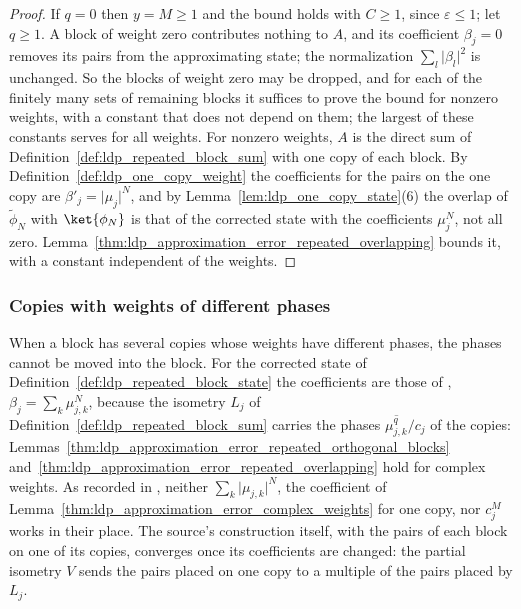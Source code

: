 \begin{proof}
    \leanok
    If $q=0$ then $y=M\geq1$ and the bound holds with $C\geq1$, since
    $\varepsilon\leq1$; let $q\geq1$. A block of weight zero contributes nothing to $A$,
    and its coefficient $\beta_j=0$ removes its pairs from the approximating state; the
    normalization $\sum_l\lvert\beta_l\rvert^2$ is unchanged. So the blocks of weight zero
    may be dropped, and for each of the finitely many sets of remaining blocks it
    suffices to prove the bound for nonzero weights, with a constant that does not
    depend on them; the largest of these constants serves for all weights. For nonzero
    weights, $A$ is the direct sum of Definition~\ref{def:ldp_repeated_block_sum} with
    one copy of each block. By Definition~\ref{def:ldp_one_copy_weight} the coefficients
    for the pairs on the one copy are $\beta'_j=\lvert\mu_j\rvert^N$, and by
    Lemma~\ref{lem:ldp_one_copy_state}(6) the overlap of $\widetilde\phi_N$ with
    $\ket{\phi_N}$ is that of the corrected state with the coefficients $\mu_j^N$, not all
    zero. Lemma~\ref{thm:ldp_approximation_error_repeated_overlapping} bounds it, with a
    constant independent of the weights.
\end{proof}


\subsubsection{Copies with weights of different phases}
\label{sec:ldp_copy_phases}

When a block has several copies whose weights have different phases, the phases
cannot be moved into the block. For the corrected state of
Definition~\ref{def:ldp_repeated_block_state} the coefficients are those of
\cite[eq.~(S4)]{Malz2024Preparation}, $\beta_j=\sum_k\mu_{j,k}^N$, because the
isometry $L_j$ of Definition~\ref{def:ldp_repeated_block_sum} carries the phases
$\overline{\mu_{j,k}^q}/c_j$ of the copies:
Lemmas~\ref{thm:ldp_approximation_error_repeated_orthogonal_blocks}
and~\ref{thm:ldp_approximation_error_repeated_overlapping} hold for complex weights.
As recorded in \cite{gap:mswc24_repeated_block_corrected_state}, neither
$\sum_k\lvert\mu_{j,k}\rvert^N$, the coefficient of
Lemma~\ref{thm:ldp_approximation_error_complex_weights} for one copy, nor $c_j^M$
works in their place. The
source's construction itself, with the pairs of each block on one of its copies,
converges once its coefficients are changed: the partial isometry $V$ sends the
pairs placed on one copy to a multiple of the pairs placed by $L_j$.

